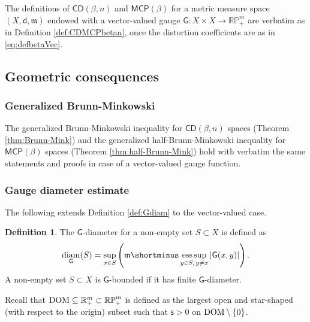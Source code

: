 \documentclass[11pt,a4paper]{article}
\theoremstyle{plain}
\theoremstyle{definition}
\newtheorem{definition}[theorem]{Definition}
\theoremstyle{remark}
\numberwithin{equation}{section}
\newcommand{\R}{\mathbb{R}} %
\newcommand{\RP}{\mathbb{RP}} %
\newcommand{\DOM}{{\rm{DOM}}}
\newcommand{\CD}{\mathsf{CD}}
\newcommand{\MCP}{\mathsf{MCP}}
\newcommand{\sfs}{\mathsf{s}}
\DeclareMathOperator{\diam}{\mathrm{diam}}
\DeclareMathOperator*{\esssup}{ess\,sup}
\newcommand{\mm}{\mathfrak m}
\newcommand{\sfd}{\mathsf d}
\newcommand{\sfG}{\mathsf G}
\begin{document}
The definitions of $\CD(\beta,n)$ and $\MCP(\beta)$ for a metric measure space $(X,\sfd,\mm)$  endowed with a vector-valued gauge $\sfG:X\times X\to \RP^m_+$ are verbatim as in Definition \ref{def:CDMCPbetan}, once the distortion coefficients are as in \eqref{eq:defbetaVec}.



\subsection{Geometric consequences}\label{sec:geometricconsequencesVec}

\subsubsection*{Generalized Brunn-Minkowski}

The generalized Brunn-Minkowski inequality for $\CD(\beta, n)$ spaces  (Theorem \ref{thm:Brunn-Mink}) and the generalized half-Brunn-Minkowski inequality for $\MCP(\beta)$ spaces (Theorem \ref{thm:half-Brunn-Mink}) hold with verbatim the same statements and proofs in case of a vector-valued gauge function.

\subsubsection*{Gauge diameter estimate}\label{sec:diamVec}

The following extends Definition \ref{def:Gdiam} to the vector-valued case.

\begin{definition}\label{def:GdiamVec}
The $\sfG$-diameter for a non-empty set $S\subset X$ is defined as
\begin{equation}
\diam_\sfG(S)=  \sup_{x\in S} \left(\mm\shortminus\esssup_{y\in S, \,  y\neq x} |\sfG(x,y)|\right).
\end{equation}
A non-empty set $S\subset X$ is $\sfG$-bounded if it has finite $\sfG$-diameter.
\end{definition}

Recall  that $\DOM\subseteq \R^m_+\subset \RP^m_+$ is defined as the largest open and star-shaped (with respect to the origin) subset such that $\sfs>0$ on $\DOM\setminus \{0\}$.
\end{document}
